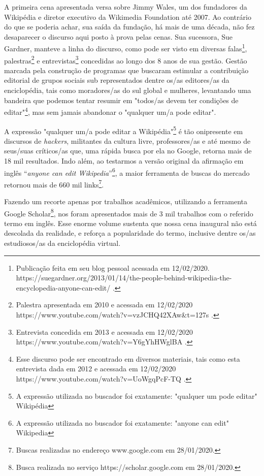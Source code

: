 A primeira cena apresentada versa sobre Jimmy Wales, um dos fundadores da Wikipédia e diretor executivo da Wikimedia Foundation até 2007. Ao contrário do que se poderia achar, sua saída da fundação, há mais de uma década, não fez desaparecer o discurso aqui posto à prova pelas cenas. Sua sucessora, Sue Gardner, manteve a linha do discurso, como pode ser visto em diversas falas\footnote{Publicação feita em seu blog pessoal acessada em 12/02/2020. https://suegardner.org/2013/01/14/the-people-behind-wikipedia-the-encyclopedia-anyone-can-edit/ .}, palestras\footnote{Palestra apresentada em 2010 e acessada em 12/02/2020 https://www.youtube.com/watch?v=vzJCHQ42XAw\&t=127s .} e entrevistas\footnote{Entrevista concedida em 2013 e acessada em 12/02/2020 https://www.youtube.com/watch?v=Y6gYhHWglBA .} concedidas ao longo dos 8 anos de sua gestão. Gestão marcada pela construção de programas que buscaram estimular a contribuição editorial de grupos sociais sub representados dentre os/as editores/as da enciclopédia, tais como moradores/as do sul global e mulheres, levantando uma bandeira que podemos tentar resumir em "todos/as devem ter condições de editar"\footnote{Esse discurso pode ser encontrado em diversos materiais, tais como esta entrevista dada em 2012 e acessada em 12/02/2020 https://www.youtube.com/watch?v=UoWgqPcF-TQ .}, mas sem jamais abandonar o "qualquer um/a pode editar".

A expressão "qualquer um/a pode editar a Wikipédia"\footnote{A expressão utilizada no buscador foi exatamente: "qualquer um pode editar" Wikipédia} é tão onipresente em discursos de \textit{hackers}, militantes da cultura livre, professores/as e até mesmo de seus/suas críticos/as que, uma rápida busca por ela no Google, retorna mais de 18 mil resultados. Indo além, ao testarmos a versão original da afirmação em inglês “\textit{anyone can edit Wikipedia}”\footnote{A expressão utilizada no buscador foi exatamente: "anyone can edit" Wikipedia}, a maior ferramenta de buscas do mercado retornou mais de 660 mil links\footnote{Buscas realizadas no endereço www.google.com em 28/01/2020.}.

Fazendo um recorte apenas por trabalhos acadêmicos, utilizando a ferramenta Google Scholar\footnote{Busca realizada no serviço https://scholar.google.com em 28/01/2020.}, nos foram apresentados mais de 3 mil trabalhos com o referido termo em inglês. Esse enorme volume sustenta que nossa cena inaugural não está descolada da realidade, e reforça a popularidade do termo, inclusive dentre os/as estudiosos/as da enciclopédia virtual.

